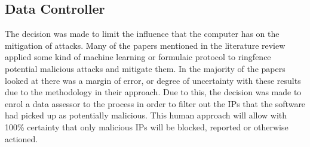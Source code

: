 \subsection*{Data Controller}
The decision was made to limit the influence that the computer has on the mitigation of attacks. Many of the papers mentioned in the literature review applied some kind of machine learning or formulaic protocol to ringfence potential malicious attacks and mitigate them. In the majority of the papers looked at there was a margin of error, or degree of uncertainty with these results due to the methodology in their approach. Due to this, the decision was made to enrol a data assessor to the process in order to filter out the IPs that the software had picked up as potentially malicious. This human approach will allow with 100\% certainty that only malicious IPs will be blocked, reported or otherwise actioned. 